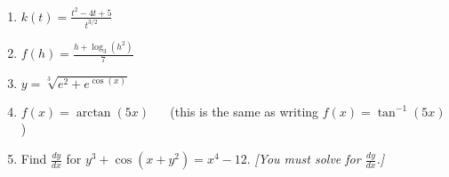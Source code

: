\documentclass[12pt]{article}
\renewcommand{\emph}[1]{\textsf{\textbf{#1}}}
\newcounter{probcount}
\newcounter{subprobcount}
\newenvironment{subproblems}{%
\begin{enumerate}%
\setcounter{enumi}{\value{subprobcount}}%
\renewcommand{\theenumi}{\emph{\alph{enumi}}}}%
{\setcounter{subprobcount}{\value{enumi}}\end{enumerate}}
\newcommand{\ds}{\displaystyle}
\begin{document}
\begin{subproblems}
\vfill

\item   $\ds k(t) = \frac{t^{2} - 4t + 5}{t^{3/2}} $
\vfill

\item   $\ds f(h) = \frac{h+\log_{3}(h^2)}{7}$\\


\vfill



\newpage


\item   $\ds y = \sqrt[3]{e^2+e^{\cos(x)}}$\\


\vfill
\vfill

\item  $\ds f(x)= \arctan{(5x)}$ $\quad$ (this is the same as writing $\ds f(x)=\tan^{-1}{(5x)}$)
\vfill

\item  Find $\ds \frac{dy}{dx}$ for $\ds 
y^{3} + \cos(x + y^{2}) = x^{4} - 12
.$ {\it [You must solve for $\ds \frac{dy}{dx}$.]}\\




\vfill
\vfill



\end{subproblems}
\end{document}
